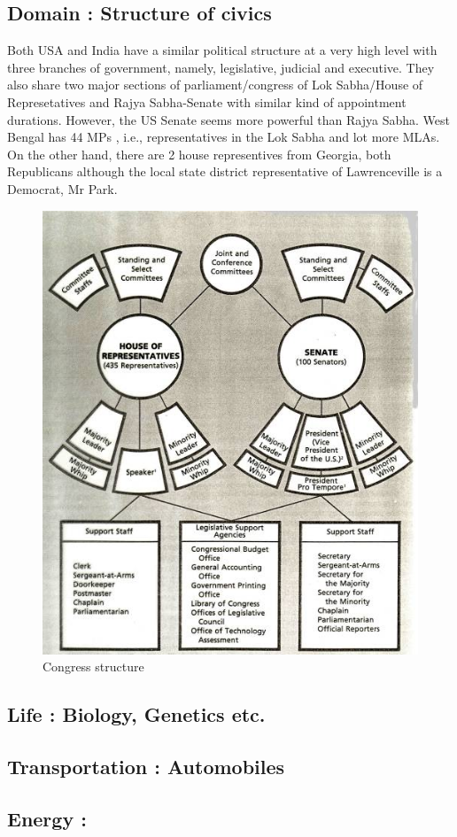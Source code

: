 \documentclass[11pt]{amsart}
\begin{document}
\subsection {Domain : Structure of civics}
Both USA and India have a similar political structure at a very high level with three branches of government, namely, legislative, judicial and executive. They also share two major sections of parliament/congress of Lok Sabha/House of Represetatives and Rajya Sabha-Senate with similar kind of appointment durations. However, the US Senate seems more powerful than Rajya Sabha. West Bengal has 44 MPs , i.e., representatives in the Lok Sabha and lot more MLAs. On the other hand, there are 2 house representives from Georgia, both Republicans although the local state district representative of Lawrenceville is a Democrat, Mr Park. 
\begin{figure}[H]
\centering
  \includegraphics[scale=0.25]{congress.jpg}
  \caption{Congress structure}
  \label{fig:congress}
\end{figure}


\subsection{Life : Biology, Genetics etc.}
\subsection{Transportation : Automobiles}
\subsection{Energy : }
\end{document}
